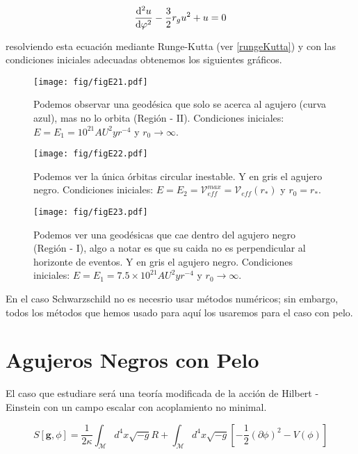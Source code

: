 \documentclass[../Main.tex]{subfiles}
\begin{document}
\begin{equation}
    \dv[2]{u}{\varphi}-\dfrac{3}{2}r_{g}u^{2}+u = 0
    \label{geodesicnull}
\end{equation}

resolviendo esta ecuación mediante Runge-Kutta (ver \ref{rungeKutta}) y con las condiciones iniciales adecuadas obtenemos los siguientes gráficos.

\begin{figure}[H]
    \centering
    \texttt{[image: fig/figE21.pdf]}
    \caption{Podemos observar una geodésica que solo se acerca al agujero (curva azul), mas no lo orbita (Región - II). Condiciones iniciales: $E=E_1=10^{21} AU^2 yr^{-4}$ y $r_0\rightarrow\infty$.}
    \label{null:acerca}
\end{figure}
\begin{figure}[H]
    \centering
    \texttt{[image: fig/figE22.pdf]}
    \caption{Podemos ver la única órbitas circular inestable. Y en gris el agujero negro. Condiciones iniciales: $E=E_2=\mathcal{V}_{eff}^{max}=\mathcal{V}_{eff}(r_*)$ y $r_0=r_{*}$.}
    \label{null:orbita}
\end{figure}

\begin{figure}[H]
    \centering
    \texttt{[image: fig/figE23.pdf]}
    \caption{Podemos ver una geodésicas que cae dentro del agujero negro (Región - I), algo a notar es que su caida no es perpendicular al horizonte de eventos. Y en gris el agujero negro. Condiciones iniciales: $E=E_1=7.5\times 10^{21} AU^2 yr^{-4}$ y $r_0\rightarrow\infty$.}
    \label{null:cae}
\end{figure}

En el caso Schwarzschild no es necesrio usar métodos numéricos; sin embargo, todos los métodos que hemos usado para aquí los usaremos para el caso con pelo.

\section{Agujeros Negros con Pelo}
El caso que estudiare será una teoría modificada de la acción de Hilbert - Einstein con un campo escalar con acoplamiento no minimal.

\begin{equation}
        S[\textbf{g},\phi]=\frac{1}{2\kappa}\int_{\mathcal{M}}d^{4}x\sqrt{-g}{R}+\int_{\mathcal{M}}d^{4}x\sqrt{-g}\left[-\frac{1}{2}(\partial\phi)^{2}-V(\phi)\right]
        \label{action}
\end{equation}
\end{document}
